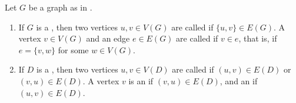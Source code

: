\begin{definition} \label{definition:adjacency_incidence_of_vertices_and_edges_in_a_graph}
Let $G$ be a graph as in .

\begin{enumerate}
    \item If $G$ is a , then two vertices $u, v \in V(G)$ are called  if $\{u,v\} \in E(G)$. A vertex $v \in V(G)$ and an edge $e \in E(G)$ are called  if $v \in e$, that is, if $e = \{v,w\}$ for some $w \in V(G)$.

    \item If $D$ is a , then two vertices $u, v \in V(D)$ are called  if $(u,v) \in E(D)$ or $(v,u) \in E(D)$. A vertex $v$ is an  if $(v,u) \in E(D)$, and an  if $(u,v) \in E(D)$.
\end{enumerate}
\end{definition}
